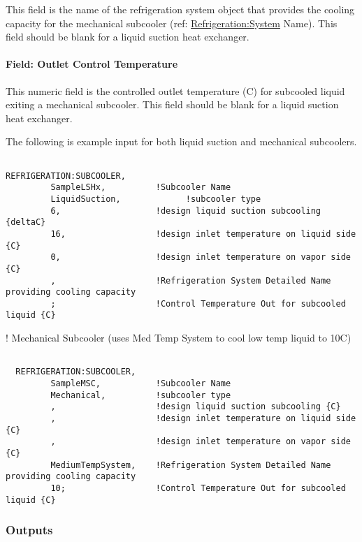 This field is the name of the refrigeration system object that provides the cooling capacity for the mechanical subcooler (ref: \hyperref[refrigerationsystem]{Refrigeration:System} Name). This field should be blank for a liquid suction heat exchanger.

\paragraph{Field: Outlet Control Temperature}\label{field-outlet-control-temperature}

This numeric field is the controlled outlet temperature (C) for subcooled liquid exiting a mechanical subcooler. This field should be blank for a liquid suction heat exchanger.

The following is example input for both liquid suction and mechanical subcoolers.

\begin{lstlisting}

REFRIGERATION:SUBCOOLER,
         SampleLSHx,          !Subcooler Name
         LiquidSuction,             !subcooler type
         6,                   !design liquid suction subcooling {deltaC}
         16,                  !design inlet temperature on liquid side {C}
         0,                   !design inlet temperature on vapor side {C}
         ,                    !Refrigeration System Detailed Name providing cooling capacity
         ;                    !Control Temperature Out for subcooled liquid {C}
\end{lstlisting}

! Mechanical Subcooler (uses Med Temp System to cool low temp liquid to 10C)

\begin{lstlisting}

  REFRIGERATION:SUBCOOLER,
         SampleMSC,           !Subcooler Name
         Mechanical,          !subcooler type
         ,                    !design liquid suction subcooling {C}
         ,                    !design inlet temperature on liquid side {C}
         ,                    !design inlet temperature on vapor side {C}
         MediumTempSystem,    !Refrigeration System Detailed Name providing cooling capacity
         10;                  !Control Temperature Out for subcooled liquid {C}
\end{lstlisting}

\subsubsection{Outputs}\label{outputs-5-008}


